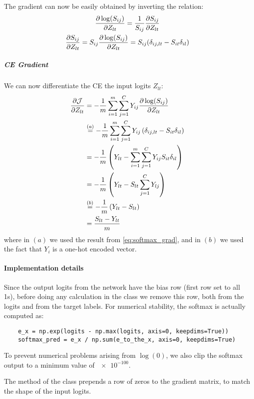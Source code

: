 The gradient can now be easily obtained by inverting the relation:
\begin{gather*}
    \pdv{\log(S_{ij})}{Z_{lt}} = \frac{1}{S_{ij}} \pdv{S_{ij}}{Z_{lt}}\nonumber\\
    \pdv{S_{ij}}{Z_{lt}} = S_{ij} \pdv{\log(S_{ij})}{Z_{lt}} = S_{ij} (\delta_{ij,lt} - S_{it} \delta_{il})
\end{gather*}

\subparagraph{\ac{CE} Gradient} We can now differentiate the \ac{CE} \wrt the input logits $Z_{lt}$:
\begin{equation}
\begin{split}
    \pdv{\mathcal{J}}{Z_{lt}} &= -\frac{1}{m} \sum_{i=1}^{m} \sum_{j=1}^{C} Y_{ij} \pdv{\log(S_{ij})}{Z_{lt}}\\
    &\overset{(a)}{=} -\frac{1}{m} \sum_{i=1}^{m} \sum_{j=1}^{C} Y_{ij} \left(\delta_{ij,lt} - S_{it} \delta_{il} \right)\\
    &= -\frac{1}{m} \left( Y_{lt} - \sum_{i=1}^{m} \sum_{j=1}^{C} Y_{ij} S_{it} \delta_{il} \right)\\
    &= -\frac{1}{m} \left( Y_{lt} - S_{lt} \sum_{j=1}^{C} Y_{lj} \right)\\
    &\overset{(b)}{=} -\frac{1}{m} \left( Y_{lt} - S_{lt} \right)\\
    &= \frac{S_{lt} - Y_{lt}}{m}
\end{split}
\end{equation}
where in $(a)$ we used the result from \cref{eq:softmax_grad}, and in $(b)$ we used the fact that $Y_i$ is a one-hot encoded vector.

\paragraph{Implementation details} Since the output logits from the network have the bias row (first row set to all 1s), before doing any calculation in the  class we remove this row, both from the logits and from the target labels. For numerical stability, the softmax is actually computed as:
\begin{verbatim}
    e_x = np.exp(logits - np.max(logits, axis=0, keepdims=True))
    softmax_pred = e_x / np.sum(e_to_the_x, axis=0, keepdims=True)
\end{verbatim}

To prevent numerical problems arising from $\log(0)$, we also clip the softmax output to a minimum value of $\num{e-100}$.

The  method of the  class prepends a row of zeros to the gradient matrix, to match the shape of the input logits.
